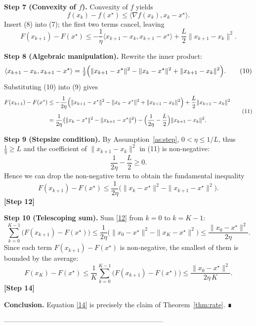 \documentclass{article}
\newcommand{\grad}{\nabla}
\begin{document}
\noindent\textbf{Step 7 (Convexity of $f$).}  
Convexity of $f$ yields
\[
f(x_{k})-f(x^{\star})\le\langle\grad f(x_{k}),x_{k}-x^{\star}\rangle .
\tag{8}
\]
Insert (8) into (7); the first two terms cancel, leaving
\[
F(x_{k+1})-F(x^{\star})
\le -\frac{1}{\eta}\langle x_{k+1}-x_{k},x_{k+1}-x^{\star}\rangle
    +\frac{L}{2}\|x_{k+1}-x_{k}\|^{2}.
\tag{9}
\]

\noindent\textbf{Step 8 (Algebraic manipulation).}  
Rewrite the inner product:
\[
\langle x_{k+1}-x_{k},x_{k+1}-x^{\star}\rangle
= \tfrac12\Bigl(\|x_{k+1}-x^{\star}\|^{2}
               -\|x_{k}-x^{\star}\|^{2}
               +\|x_{k+1}-x_{k}\|^{2}\Bigr).
\tag{10}
\]
Substituting (10) into (9) gives
\[
\begin{aligned}
F(x_{k+1})-F(x^{\star})
&\le -\frac{1}{2\eta}\Bigl(\|x_{k+1}-x^{\star}\|^{2}
               -\|x_{k}-x^{\star}\|^{2}
               +\|x_{k+1}-x_{k}\|^{2}\Bigr)
   +\frac{L}{2}\|x_{k+1}-x_{k}\|^{2}\\[4pt]
&= \frac{1}{2\eta}\bigl(\|x_{k}-x^{\star}\|^{2}
               -\|x_{k+1}-x^{\star}\|^{2}\bigr)
   -\Bigl(\frac{1}{2\eta}-\frac{L}{2}\Bigr)\|x_{k+1}-x_{k}\|^{2}.
\end{aligned}
\tag{11}
\]

\noindent\textbf{Step 9 (Stepsize condition).}  
By Assumption~\ref{as:step}, $0<\eta\le 1/L$, thus $\frac{1}{\eta}\ge L$ and the coefficient of $\|x_{k+1}-x_{k}\|^{2}$ in (11) is non‑negative:
\[
\frac{1}{2\eta}-\frac{L}{2}\ge 0.
\]
Hence we can drop the non‑negative term to obtain the fundamental inequality
\[
F(x_{k+1})-F(x^{\star})\le
\frac{1}{2\eta}\bigl(\|x_{k}-x^{\star}\|^{2}
               -\|x_{k+1}-x^{\star}\|^{2}\bigr).
\tag{12}
\]
\textbf{[Step 12]}

\noindent\textbf{Step 10 (Telescoping sum).}  
Sum \eqref{12} from $k=0$ to $k=K-1$:
\[
\sum_{k=0}^{K-1}\bigl(F(x_{k+1})-F(x^{\star})\bigr)
\le\frac{1}{2\eta}\bigl(\|x_{0}-x^{\star}\|^{2}-\|x_{K}-x^{\star}\|^{2}\bigr)
\le\frac{\|x_{0}-x^{\star}\|^{2}}{2\eta}.
\tag{13}
\]
Since each term $F(x_{k+1})-F(x^{\star})$ is non‑negative, the smallest of them is bounded by the average:
\[
F(x_{K})-F(x^{\star})
\le\frac{1}{K}\sum_{k=0}^{K-1}\bigl(F(x_{k+1})-F(x^{\star})\bigr)
\le\frac{\|x_{0}-x^{\star}\|^{2}}{2\eta\,K}.
\tag{14}
\]
\textbf{[Step 14]}

\noindent\textbf{Conclusion.} Equation \eqref{14} is precisely the claim of Theorem~\ref{thm:rate}. ∎

---------------------------------------------------------------------
\end{document}
